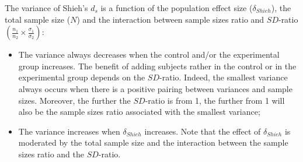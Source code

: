 \documentclass[
  english,
  man,mask]{apa6}
\begin{document}
The variance of Shieh's \(d_s\) is a function of the population effect size (\(\delta_{Shieh}\)), the total sample size (\(N\)) and the interaction between sample sizes ratio and \(SD\)-ratio \(\left(\frac{n_1}{n_2}\times\frac{\sigma_1}{\sigma_2} \right)\):

\begin{itemize}
\item
  The variance always decreases when the control and/or the experimental group increases. The benefit of adding subjects rather in the control or in the experimental group depends on the \(SD\)-ratio. Indeed, the smallest variance always occurs when there is a positive pairing between variances and sample sizes. Moreover, the further the \(SD\)-ratio is from 1, the further from 1 will also be the sample sizes ratio associated with the smallest variance;
\item
  The variance increases when \(\delta_{Shieh}\) increases. Note that the effect of \(\delta_{Shieh}\) is moderated by the total sample size and the interaction between the sample sizes ratio and the \(SD\)-ratio.
\end{itemize}
\end{document}
